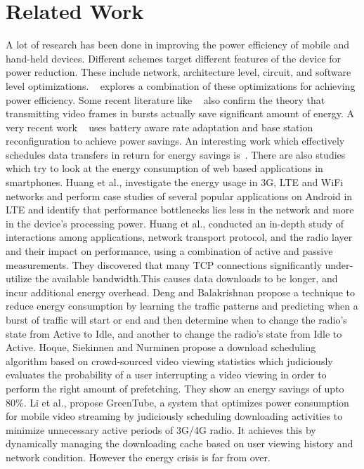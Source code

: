 \section{Related Work}
A lot of research has been done in improving the power efficiency of mobile and hand-held devices. Different schemes target different features of the device for power reduction. These include network, architecture level, circuit, and software level optimizations. ~\cite{mohapatra_mm03} explores a combination of these optimizations for achieving power efficiency. Some recent literature like ~\cite{mobiarch,movid} also confirm the theory that transmitting video frames in bursts actually save significant amount of energy. A very recent work ~\cite{ucsd_wcnc} uses battery aware rate adaptation and base station reconfiguration to achieve power savings. An interesting work which effectively schedules data transfers in return for energy savings is~\cite{balasubramanian_imc09}. There are also studies which try to look at the energy consumption of web based applications in smartphones. Huang et al.,\cite{huang2012close} investigate the energy usage in 3G, LTE and WiFi networks and perform case studies of several popular applications on Android in LTE and identify that performance bottlenecks lies less in the network and more in the device's processing power.
Huang et al.,\cite{huang2013depth} conducted an in-depth study of interactions among applications, network transport protocol, and the radio layer and their impact on performance, using a combination of active and passive measurements. They discovered that many TCP connections significantly under-utilize the available bandwidth.This causes data downloads to be longer, and incur additional energy overhead.  
Deng and Balakrishnan\cite{deng2012traffic} propose a technique to reduce energy consumption by learning the traffic patterns and predicting when a burst of traffic will start or end and then determine when to change the radio's state from Active to Idle, and another to change the radio's state from Idle to Active.
Hoque, Siekinnen and Nurminen\cite{hoque2013using} propose a download scheduling algorithm based on crowd-sourced video viewing statistics which judiciously evaluates the probability of a user interrupting a video viewing in order to perform the right amount of prefetching. They show an energy savings of upto 80\%.
Li et al.,\cite{li2012greentube} propose GreenTube, a system that optimizes power consumption for mobile video streaming by judiciously scheduling downloading activities to minimize unnecessary active periods of 3G/4G radio. It achieves this by dynamically managing the downloading cache based on user viewing history and network condition. 
However the energy crisis is far from over. 

